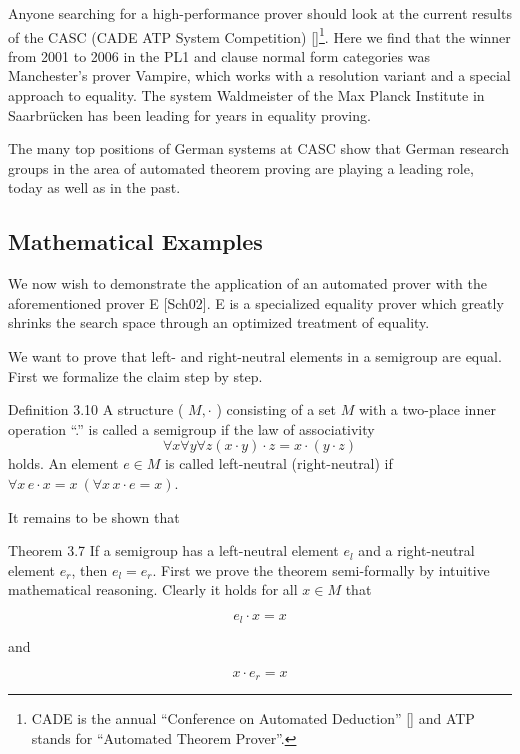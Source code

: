 \documentclass[10pt]{book}
\begin{document}
Anyone searching for a high-performance prover should look at the current results of the CASC (CADE ATP System Competition) [\cite{ss06}]\footnote{CADE is the annual ``Conference on Automated Deduction'' [\cite{cad}] and ATP stands for ``Automated Theorem Prover''.}. Here we find that the winner from 2001 to 2006 in the PL1 and clause normal form categories was Manchester's prover Vampire, which works with a resolution variant and a special approach to equality. The system Waldmeister of the Max Planck Institute in Saarbrücken has been leading for years in equality proving.

The many top positions of German systems at CASC show that German research groups in the area of automated theorem proving are playing a leading role, today as well as in the past.

\subsection{Mathematical Examples}
We now wish to demonstrate the application of an automated prover with the aforementioned prover E [Sch02]. E is a specialized equality prover which greatly shrinks the search space through an optimized treatment of equality.

We want to prove that left- and right-neutral elements in a semigroup are equal. First we formalize the claim step by step.

Definition 3.10 A structure ( $M, \cdot$ ) consisting of a set $M$ with a two-place inner operation ``.'' is called a semigroup if the law of associativity
$$
\forall x \forall y \forall z (x \cdot y) \cdot z = x \cdot (y \cdot z)
$$
holds. An element $e \in M$ is called left-neutral (right-neutral) if $\forall x\, e \cdot x = x \ (\forall x\, x \cdot e = x)$.

It remains to be shown that

Theorem 3.7 If a semigroup has a left-neutral element $e_{l}$ and a right-neutral element $e_{r}$, then $e_{l}=e_{r}$.
First we prove the theorem semi-formally by intuitive mathematical reasoning. Clearly it holds for all $x \in M$ that

\begin{equation*}
e_{l} \cdot x=x \tag{3.8}
\end{equation*}

and

\begin{equation*}
x \cdot e_{r}=x \tag{3.9}
\end{equation*}
\end{document}
